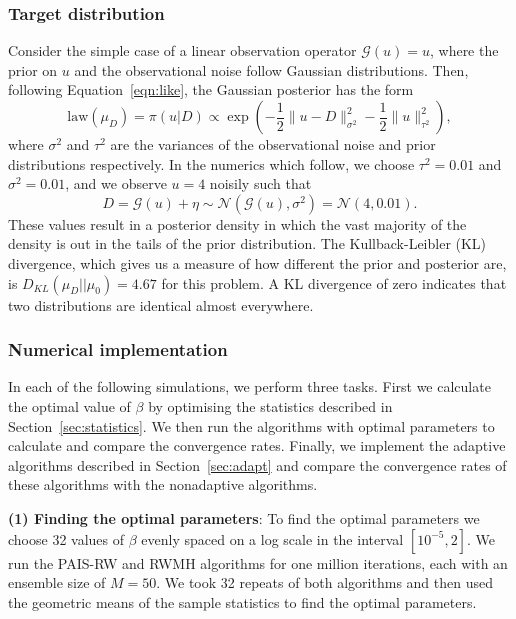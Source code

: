 \documentclass[final]{siamltex}
\newcommand{\G}{\mathcal{G}}
\begin{document}
\subsubsection{Target distribution}

Consider the simple case of a linear observation operator $\G(u) = u$, where the prior on $u$ and the observational noise follow Gaussian distributions. Then, following Equation~\ref{eqn:like}, the Gaussian posterior has the form
\begin{equation}\label{eqn:Gaussian posterior}
	\text{law}(\mu_D) = \pi(u|D) \propto \exp\left(-\frac{1}{2}\big\|u - D\big\|^2_{\sigma^2} - \frac{1}{2}\big\|u\big\|^2_{\tau^2}\right),
\end{equation}
where $\sigma^2$ and $\tau^2$ are the variances of the
observational noise and prior distributions respectively. In the
numerics which follow, we choose $\tau^2 =0.01$ and $\sigma^2 = 0.01$, and
we observe $u=4$ noisily such that
\[
D = \mathcal{G}(u) + \eta \sim \mathcal{N}(\mathcal{G}(u),\sigma^2) = \mathcal{N}(4,0.01).
\]
These values result in a posterior density in which the vast majority
of the density is out in the tails of the
prior distribution. The Kullback-Leibler (KL)
divergence, which gives us a measure of how different the prior and
posterior are, is $D_{KL}(\mu_D || \mu_0) = 4.67$ for this
problem. A KL divergence of zero indicates that two distributions are
identical almost everywhere.

\subsubsection{Numerical implementation}\label{sec:Implementation P1}

In each of the following simulations, we perform three tasks. First we calculate the optimal value of $\beta$ by optimising the statistics described in Section~\ref{sec:statistics}. We then run the algorithms with optimal parameters to calculate and compare the convergence rates. Finally, we implement the adaptive algorithms described in Section~\ref{sec:adapt} and compare the convergence rates of these algorithms with the nonadaptive algorithms.

{\bf (1) Finding the optimal parameters}: To find the optimal
parameters we choose 32 values of $\beta$ evenly spaced on a log scale
in the interval $[10^{-5}, 2]$. We run the PAIS-RW and RWMH algorithms for one million iterations, each with an ensemble size of $M=50$. We took 32 repeats of both algorithms and then used the geometric means of the sample statistics to find the optimal parameters.
\end{document}
